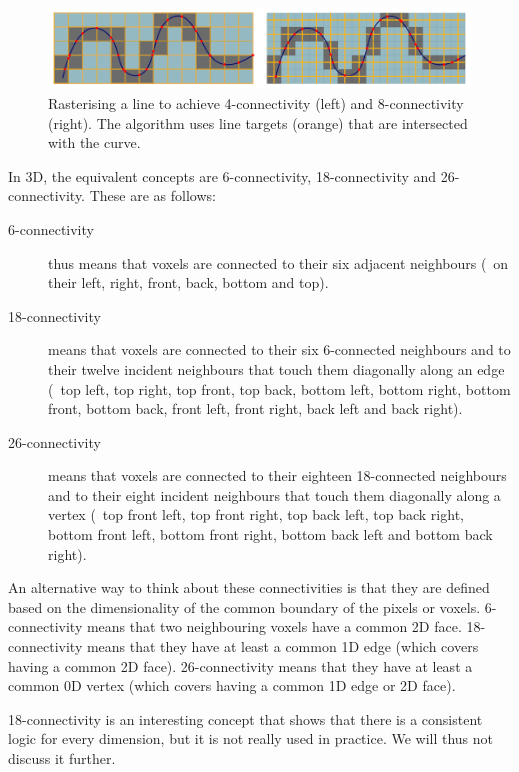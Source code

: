 \begin{figure}
\centering
\includegraphics[width=\linewidth]{figs/rasterisation}
\caption{Rasterising a line to achieve 4-connectivity (left) and 8-connectivity (right). The algorithm uses line targets (orange) that are intersected with the curve.}%
\label{fig:rasterisation}
\end{figure}

In 3D, the equivalent concepts are 6-connectivity, 18-connectivity and 26-connectivity.
These are as follows:
\begin{description}
\item[6-connectivity]  thus means that voxels are connected to their six adjacent neighbours (\ie\ on their left, right, front, back, bottom and top).
\item[18-connectivity]  means that voxels are connected to their six 6-connected neighbours and to their twelve incident neighbours that touch them diagonally along an edge (\ie\ top left, top right, top front, top back, bottom left, bottom right, bottom front, bottom back, front left, front right, back left and back right).
\item[26-connectivity]  means that voxels are connected to their eighteen 18-connected neighbours and to their eight incident neighbours that touch them diagonally along a vertex (\ie\ top front left, top front right, top back left, top back right, bottom front left, bottom front right, bottom back left and bottom back right).
\end{description}

An alternative way to think about these connectivities is that they are defined based on the dimensionality of the common boundary of the pixels or voxels.
6-connectivity means that two neighbouring voxels have a common 2D face.
18-connectivity means that they have at least a common 1D edge (which covers having a common 2D face).
26-connectivity means that they have at least a common 0D vertex (which covers having a common 1D edge or 2D face).

18-connectivity is an interesting concept that shows that there is a consistent logic for every dimension, but it is not really used in practice.
We will thus not discuss it further.

